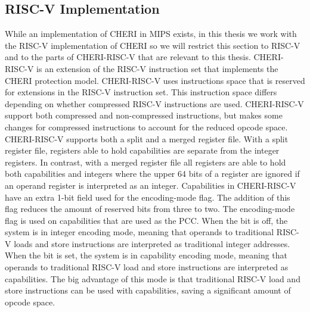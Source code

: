 \subsection{RISC-V Implementation}
While an implementation of CHERI in MIPS exists, in this thesis we work with the RISC-V implementation of CHERI so we will restrict this section to RISC-V and to the parts of CHERI-RISC-V that are relevant to this thesis. CHERI-RISC-V is an extension of the RISC-V instruction set that implements the CHERI protection model. CHERI-RISC-V uses instructions space that is reserved for extensions in the RISC-V instruction set. This instruction space differs depending on whether compressed RISC-V instructions are used. CHERI-RISC-V support both compressed and non-compressed instructions, but makes some changes for compressed instructions to account for the reduced opcode space.
CHERI-RISC-V supports both a split and a merged register file. With a split register file, registers able to hold capabilities are separate from the integer registers. In contrast, with a merged register file all registers are able to hold both capabilities and integers where the upper 64 bits of a register are ignored if an operand register is interpreted as an integer.
Capabilities in CHERI-RISC-V have an extra 1-bit field used for the encoding-mode flag. The addition of this flag reduces the amount of reserved bits from three to two. The encoding-mode flag is used on capabilities that are used as the PCC. When the bit is off, the system is in integer encoding mode, meaning that operands to traditional RISC-V loads and store instructions are interpreted as traditional integer addresses. When the bit is set, the system is in capability encoding mode, meaning that operands to traditional RISC-V load and store instructions are interpreted as capabilities. The big advantage of this mode is that traditional RISC-V load and store instructions can be used with capabilities, saving a significant amount of opcode space.
